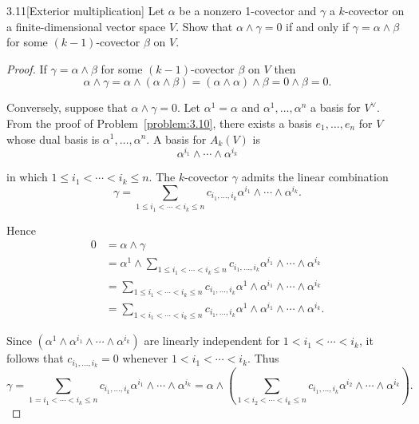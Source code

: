 \begin{problem}{3.11}[Exterior multiplication]
Let \( \alpha \) be a nonzero 1-covector and \( \gamma \) a \( k \)-covector on a finite-dimensional vector space \( V \). Show that \( \alpha \land \gamma = 0 \) if and only if \( \gamma = \alpha \land \beta \) for some \( (k-1) \)-covector \( \beta \) on \( V \).
\end{problem}

\begin{proof}
    If \( \gamma = \alpha \wedge \beta \) for some \( (k - 1) \)-covector \( \beta \) on \( V \) then
    \[
        \alpha \wedge \gamma = \alpha \wedge (\alpha \wedge \beta) = (\alpha \wedge \alpha) \wedge \beta = 0 \wedge \beta = 0.
    \]

    Conversely, suppose that \( \alpha \wedge \gamma = 0 \). Let \( \alpha^{1} = \alpha \) and \( \alpha^{1}, \ldots, \alpha^{n} \) a basis for \( V^{\vee} \). From the proof of Problem~\ref{problem:3.10}, there exists a basis \( e_{1}, \ldots, e_{n} \) for \( V \) whose dual basis is \( \alpha^{1}, \ldots, \alpha^{n} \). A basis for \( A_{k}(V) \) is
    \[
        \alpha^{i_{1}} \wedge \cdots \wedge \alpha^{i_{k}}
    \]

    in which \( 1 \leq i_{1} < \cdots < i_{k} \leq n \). The \( k \)-covector \( \gamma \) admits the linear combination
    \[
        \gamma = \sum_{1 \leq i_{1} < \cdots < i_{k} \leq n} c_{i_{1},\ldots,i_{k}} \alpha^{i_{1}} \wedge \cdots \wedge \alpha^{i_{k}}.
    \]

    Hence
    \begingroup
    \allowdisplaybreaks%
    \begin{align*}
        0 & = \alpha \wedge \gamma                                                                                                                    \\
          & = \alpha^{1} \wedge \sum_{1 \leq i_{1} < \cdots < i_{k} \leq n} c_{i_{1},\ldots,i_{k}} \alpha^{i_{1}} \wedge \cdots \wedge \alpha^{i_{k}} \\
          & = \sum_{1 \leq i_{1} < \cdots < i_{k} \leq n} c_{i_{1},\ldots,i_{k}} \alpha^{1}\wedge \alpha^{i_{1}} \wedge \cdots \wedge \alpha^{i_{k}}  \\
          & = \sum_{1 < i_{1} < \cdots < i_{k} \leq n} c_{i_{1},\ldots,i_{k}} \alpha^{1}\wedge \alpha^{i_{1}} \wedge \cdots \wedge \alpha^{i_{k}}.
    \end{align*}
    \endgroup

    Since \( (\alpha^{1}\wedge \alpha^{i_{1}} \wedge \cdots \wedge \alpha^{i_{k}}) \) are linearly independent for \( 1 < i_{1} < \cdots < i_{k} \), it follows that \( c_{i_{1},\ldots,i_{k}} = 0 \) whenever \( 1 < i_{1} < \cdots < i_{k} \). Thus
    \[
        \gamma = \sum_{1 = i_{1} < \cdots < i_{k} \leq n} c_{i_{1},\ldots,i_{k}} \alpha^{i_{1}} \wedge \cdots \wedge \alpha^{i_{k}} = \alpha \wedge \left(\sum_{1 < i_{2} < \cdots < i_{k} \leq n} c_{i_{1},\ldots,i_{k}} \alpha^{i_{2}} \wedge \cdots \wedge \alpha^{i_{k}}\right).
    \]


\end{proof}
